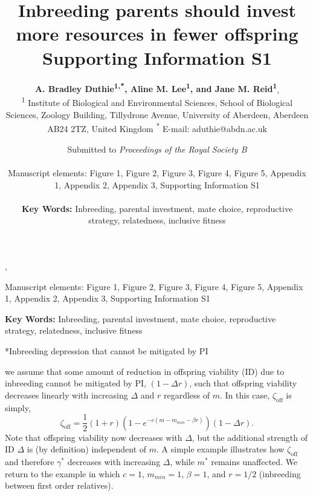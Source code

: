 \documentclass[12pt]{article}
\title{Inbreeding parents should invest more resources in fewer offspring \\ \vspace{5 mm} Supporting Information S1}
\author{{\bf A. Bradley Duthie\textsuperscript{1,*}, Aline M. Lee\textsuperscript{1}, and Jane M. Reid\textsuperscript{1}}, \\ {\footnotesize \textsuperscript{1} Institute of Biological and Environmental Sciences, School of Biological Sciences, Zoology Building, Tillydrone Avenue, University of Aberdeen, Aberdeen AB24 2TZ, United Kingdom \textsuperscript{*} E-mail: aduthie@abdn.ac.uk}}
\author{Submitted to \emph{Proceedings of the Royal Society B} \\ \\ Manuscript elements: Figure 1, Figure 2, Figure 3, Figure 4, Figure 5, Appendix 1, Appendix 2, Appendix 3, Supporting Information S1\\ \\ \textbf{Key Words:} Inbreeding, parental investment, mate choice, reproductive strategy, relatedness, inclusive fitness}
\author{}
\date{}
\makeatletter
\renewcommand\section{\@startsection{section}{1}{0in}{-0.5\baselineskip}{0.1\baselineskip}{\normalfont\large\bfseries}}
\makeatother
\begin{document}
\maketitle

\begin{center}
\vspace{5 mm}

, \\ 

\vspace{5 mm}


\vspace{15 mm}


\vspace{15 mm} 

\noindent Manuscript elements: Figure 1, Figure 2, Figure 3, Figure 4, Figure 5, Appendix 1, Appendix 2, Appendix 3, Supporting Information S1\\ 

\vspace{15 mm}

\noindent \textbf{Key Words:} Inbreeding, parental investment, mate choice, reproductive strategy, relatedness, inclusive fitness
\newline
\end{center}

\linenumbers
\modulolinenumbers[2]

\doublespacing
\clearpage

\section*{Inbreeding depression that cannot be mitigated by PI}

 we assume that some amount of reduction in offspring viability (ID) due to inbreeding cannot be mitigated by PI, $(1 - \Delta r)$, such that offspring viability decreases linearly with increasing $\Delta$ and $r$ regardless of $m$. In this case, $\zeta_{\textrm{off}}$ is simply,
\begin{equation}
\zeta_{\textrm{off}} = \frac{1}{2}\left(1+r\right)\left(1-e^{-c\left(m-m_{min}-\beta r\right)}\right) \left(1 - \Delta r\right).
\end{equation}
Note that offspring viability now decreases with $\Delta$, but the additional strength of ID $\Delta$ is (by definition) independent of $m$. A simple example illustrates how $\zeta_{\textrm{off}}$ and therefore $\gamma^{*}$ decreases with increasing $\Delta$, while $m^{*}$ remains unaffected. We return to the example in which $c=1$, $m_{min}=1$, $\beta=1$, and $r=1/2$ (inbreeding between first order relatives).
\end{document}
